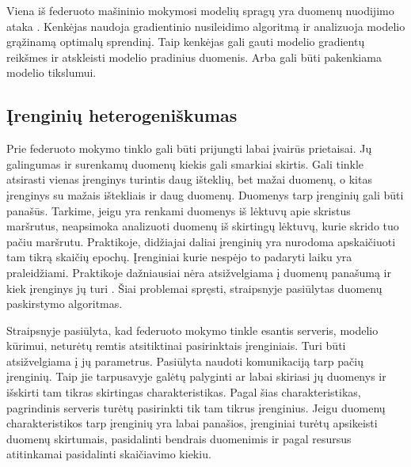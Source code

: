\documentclass{VUMIFInfBakalaurinis}
\begin{document}
\par Viena iš federuoto mašininio mokymosi modelių spragų yra duomenų nuodijimo ataka \cite{19}. Kenkėjas naudoja gradientinio nusileidimo algoritmą ir analizuoja modelio grąžinamą optimalų sprendinį. Taip kenkėjas gali gauti modelio gradientų reikšmes ir atskleisti modelio pradinius duomenis. Arba gali būti pakenkiama modelio tikslumui.


\subsection{Įrenginių heterogeniškumas}
\par Prie federuoto mokymo tinklo gali būti prijungti labai įvairūs prietaisai. Jų galingumas ir surenkamų duomenų kiekis gali smarkiai skirtis. Gali tinkle atsirasti vienas įrenginys turintis daug išteklių, bet mažai duomenų, o kitas įrenginys su mažais ištekliais ir daug duomenų. Duomenys tarp įrenginių gali būti panašūs. Tarkime, jeigu yra renkami duomenys iš lėktuvų apie skristus maršrutus, neapsimoka analizuoti duomenų iš skirtingų lėktuvų, kurie skrido tuo pačiu maršrutu. Praktikoje, didžiajai daliai įrenginių yra nurodoma apskaičiuoti tam tikrą skaičių epochų. Įrenginiai kurie nespėjo to padaryti laiku yra praleidžiami. Praktikoje dažniausiai nėra atsižvelgiama į duomenų panašumą ir kiek įrenginys jų turi \cite{20}. Šiai problemai spręsti, straipsnyje \cite{21} pasiūlytas duomenų paskirstymo algoritmas. %
\par Straipsnyje \cite{20} pasiūlyta, kad federuoto mokymo tinkle esantis serveris, modelio kūrimui, neturėtų remtis atsitiktinai pasirinktais įrenginiais. Turi būti atsižvelgiama į jų parametrus. Pasiūlyta naudoti komunikaciją tarp pačių įrenginių. Taip jie tarpusavyje galėtų palyginti ar labai skiriasi jų duomenys ir išskirti tam tikras skirtingas charakteristikas. Pagal šias charakteristikas, pagrindinis serveris turėtų pasirinkti tik tam tikrus įrenginius. Jeigu duomenų charakteristikos tarp įrenginių yra labai panašios, įrenginiai turėtų apsikeisti duomenų skirtumais, pasidalinti bendrais duomenimis ir pagal resursus atitinkamai pasidalinti skaičiavimo kiekiu. 
\end{document}
